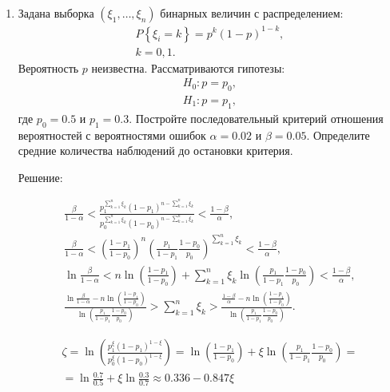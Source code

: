 \documentclass[a4paper,12pt]{article}
\newcommand{\probability}[1]{P \left\{ #1 \right\}}
\begin{document}
\begin{enumerate}
      \item Задана выборка $\left( \xi_1, \dots, \xi_n \right)$ бинарных величин с распределением:
            \begin{gather*}
                  \probability{\xi_i = k} = p^k (1-p)^{1-k}, \\
                  k = 0,1.
            \end{gather*}
            Вероятность $p$ неизвестна. Рассматриваются гипотезы:
            \begin{gather*}
                  H_0: p = p_0 , \\
                  H_1: p = p_1 ,
            \end{gather*}
            где $p_0 = 0.5$ и $p_1 = 0.3$. Постройте последовательный критерий отношения вероятностей с вероятностями ошибок $\alpha = 0.02$ и
            $\beta = 0.05$. Определите средние количества наблюдений до остановки критерия.

            Решение:

            \begin{gather*}
                  \frac{\beta}{1-\alpha} < \frac{p_1^{\sum_{k=1}^n \xi_k}(1-p_1)^{n - \sum_{k=1}^n \xi_k}}{p_0^{\sum_{k=1}^n \xi_k}(1-p_0)^{n - \sum_{k=1}^n \xi_k}} < \frac{1-\beta}{\alpha} , \\
                  \frac{\beta}{1-\alpha} < \left( \frac{1-p_1}{1-p_0} \right)^n \left( \frac{p_1}{1-p_1} \frac{1-p_0}{p_0} \right)^{\sum_{k=1}^n \xi_k} < \frac{1-\beta}{\alpha} , \\
                  \ln \frac{\beta}{1-\alpha} < n \ln \left( \frac{1-p_1}{1-p_0} \right) + \sum_{k=1}^n \xi_k \ln \left( \frac{p_1}{1-p_1} \frac{1-p_0}{p_0} \right) < \frac{1-\beta}{\alpha} , \\
                  \frac{\ln \frac{\beta}{1-\alpha} - n \ln \left( \frac{1-p_1}{1-p_0} \right)}{\ln \left( \frac{p_1}{1-p_1} \frac{1-p_0}{p_0} \right)} >  \sum_{k=1}^n \xi_k > \frac{\frac{1-\beta}{\alpha} - n \ln \left( \frac{1-p_1}{1-p_0} \right)}{\ln \left( \frac{p_1}{1-p_1} \frac{1-p_0}{p_0} \right)} .
            \end{gather*}

            \begin{multline*}
                  \zeta
                  = \ln \left( \frac{p_1^\xi (1-p_1)^{1-\xi}}{p_0^\xi (1-p_0)^{1-\xi}} \right)
                  = \ln \left( \frac{1-p_1}{1-p_0} \right) + \xi \ln \left( \frac{p_1}{1-p_1} \frac{1-p_0}{p_0} \right) = \\
                  = \ln \frac{0.7}{0.5} + \xi \ln \frac{0.3}{0.7}
                  \approx 0.336 - 0.847 \xi
            \end{multline*}


\end{enumerate}
\end{document}
